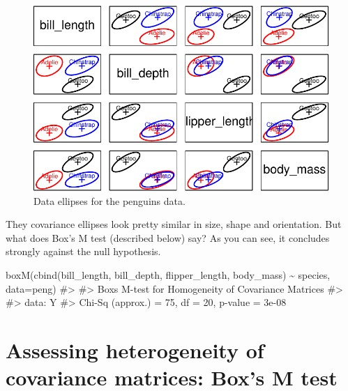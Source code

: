 \documentclass[
  letterpaper,
  10pt,
  krantz2]{krantz}
\makeatletter
\newenvironment{Shaded}{\begin{snugshade}}{\end{snugshade}}
\newcommand{\AttributeTok}[1]{\textcolor[rgb]{0.40,0.45,0.13}{#1}}
\newcommand{\CommentTok}[1]{\textcolor[rgb]{0.37,0.37,0.37}{#1}}
\newcommand{\FunctionTok}[1]{\textcolor[rgb]{0.28,0.35,0.67}{#1}}
\newcommand{\NormalTok}[1]{\textcolor[rgb]{0.00,0.23,0.31}{#1}}
\newcommand{\SpecialCharTok}[1]{\textcolor[rgb]{0.37,0.37,0.37}{#1}}
\newenvironment{kframe}{%
  \medskip{}
  \setlength{\fboxsep}{.8em}
  \def\at@end@of@kframe{}%
  \ifinner\ifhmode%
  \def\at@end@of@kframe{\end{minipage}}%
  \begin{minipage}{\columnwidth}%
  \fi\fi%
  \def\FrameCommand##1{\hskip\@totalleftmargin \hskip-\fboxsep
  \colorbox{shadecolor}{##1}\hskip-\fboxsep
      \hskip-\linewidth \hskip-\@totalleftmargin \hskip\columnwidth}%
  \MakeFramed {\advance\hsize-\width
    \@totalleftmargin\z@ \linewidth\hsize
    \@setminipage}}%
{\par\unskip\endMakeFramed%
  \at@end@of@kframe}
\renewenvironment{Shaded}{\begin{kframe}}{\end{kframe}}
\makeatother
\begin{document}
\begin{figure}

{\centering \includegraphics[width=1\textwidth,height=\textheight]{figs/fig-peng-covEllipse0-1.pdf}

}

\caption{\label{fig-peng-covEllipse0}Data ellipses for the penguins
data.}

\end{figure}

They covariance ellipses look pretty similar in size, shape and
orientation. But what does Box's M test (described below) say? As you
can see, it concludes strongly against the null hypothesis.

\begin{Shaded}
\begin{Highlighting}[]
\FunctionTok{boxM}\NormalTok{(}\FunctionTok{cbind}\NormalTok{(bill\_length, bill\_depth, flipper\_length, body\_mass) }\SpecialCharTok{\textasciitilde{}}\NormalTok{ species, }\AttributeTok{data=}\NormalTok{peng)}
\CommentTok{\#\textgreater{} }
\CommentTok{\#\textgreater{}  Box\textquotesingle{}s M{-}test for Homogeneity of Covariance Matrices}
\CommentTok{\#\textgreater{} }
\CommentTok{\#\textgreater{} data:  Y}
\CommentTok{\#\textgreater{} Chi{-}Sq (approx.) = 75, df = 20, p{-}value = 3e{-}08}
\end{Highlighting}
\end{Shaded}

\hypertarget{sec-boxM}{%
\section{Assessing heterogeneity of covariance matrices: Box's M
test}\label{sec-boxM}}
\end{document}
